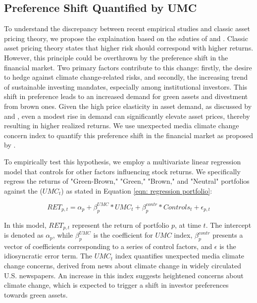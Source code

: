 \documentclass[12pt]{article}
\begin{document}
\subsection{Preference Shift Quantified by UMC}
To understand the discrepancy between recent empirical studies and classic asset pricing theory, we propose the explaination based on the sduties of \citet{koijen2019demand} and \citet{pastor2021sustainable}. Classic asset pricing theory states that higher risk should correspond with higher returns. However, this principle could be overthrown by the preference shift in the financial market. Two primary factors contribute to this change: firstly, the desire to hedge against climate change-related risks, and secondly, the increasing trend of sustainable investing mandates, especially among institutional investors. This shift in preference leads to an increased demand for green assets and divestment from brown ones. Given the high price elasticity in asset demand, as discussed by \citet{gabaix2021search} and \citet{hartzmark2022predictable}, even a modest rise in demand can significantly elevate asset prices, thereby resulting in higher realized returns. We use unexpected media climate change concern index to quantify this preference shift in the financial market as proposed by \citet{ardia2022climate}.

To empirically test this hypothesis, we employ a multivariate linear regression model that controls for other factors influencing stock returns. We specifically regress the returns of "Green-Brown," "Green," "Brown," and "Neutral" portfolios against the ($UMC_t$) as stated in Equation \ref{eqn: regression portfolio}:

\begin{equation}
\label{eqn: regression portfolio}
RET_{p, t} = \alpha_p + \beta^{UMC}_{p}*UMC_t + \beta^{contr}_p*Controls_t + \epsilon_{p, t}
\end{equation}

\noindent In this model, $RET_{p, t}$ represent the return of portfolio $p$, at time $t$. The intercept is denoted as $\alpha_p$, while $\beta^{UMC}_p$ is the coefficient for $UMC$ index, $\beta^{contr}_p$ presents a vector of coefficients corresponding to a series of control factors, and $\epsilon$ is the idiosyncratic error term. The $UMC_t$ index quantifies unexpected media climate change concerns, derived from news about climate change in widely circulated U.S. newspapers. An increase in this index suggests heightened concerns about climate change, which is expected to trigger a shift in investor preferences towards green assets.
\end{document}

